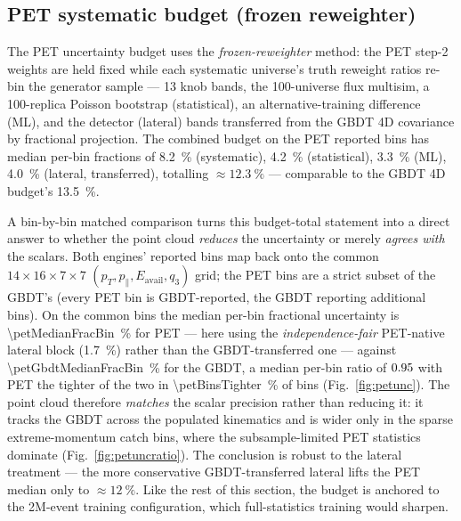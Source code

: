 \subsection{PET systematic budget (frozen reweighter)}
\label{sec:pet-syst}
The PET uncertainty budget uses the \emph{frozen-reweighter}
method: the PET step-2 weights are held fixed while each systematic
universe's truth reweight ratios re-bin the generator sample --- 13 knob
bands, the 100-universe flux multisim, a 100-replica Poisson bootstrap
(statistical), an alternative-training difference (ML), and the detector
(lateral) bands transferred from the GBDT 4D covariance by fractional
projection. The combined budget on the PET reported bins has median
per-bin fractions of \SI{8.2}{\percent} (systematic), \SI{4.2}{\percent}
(statistical), \SI{3.3}{\percent} (ML), \SI{4.0}{\percent} (lateral,
transferred), totalling $\approx\SI{12.3}{\percent}$ --- comparable to the
GBDT 4D budget's \SI{13.5}{\percent}.

A bin-by-bin matched comparison turns this budget-total statement into a
direct answer to whether the point cloud \emph{reduces} the uncertainty or
merely \emph{agrees with} the scalars. Both engines' reported bins map back
onto the common $14\times16\times7\times7$
$(p_T,p_\parallel,E_\text{avail},q_3)$ grid; the \petCommonBins{} PET bins are
a strict subset of the GBDT's (every PET bin is GBDT-reported, the GBDT
reporting \petGbdtExtra{} additional bins). On the common bins the median
per-bin fractional uncertainty is \SI{\petMedianFracBin}{\percent} for PET ---
here using the \emph{independence-fair} PET-native lateral block
(\SI{1.7}{\percent}) rather than the GBDT-transferred one --- against
\SI{\petGbdtMedianFracBin}{\percent} for the GBDT, a median per-bin ratio of
$0.95$ with PET the tighter of the two in
\SI{\petBinsTighter}{\percent} of bins (Fig.~\ref{fig:petunc}). The point
cloud therefore \emph{matches} the scalar precision rather than reducing it:
it tracks the GBDT across the populated kinematics and is wider only in the
sparse extreme-momentum catch bins, where the subsample-limited PET
statistics dominate (Fig.~\ref{fig:petuncratio}). The conclusion is robust to
the lateral treatment --- the more conservative GBDT-transferred lateral lifts
the PET median only to $\approx\SI{12}{\percent}$. Like the rest of this
section, the budget is anchored to the 2M-event training configuration,
which full-statistics training would sharpen.

